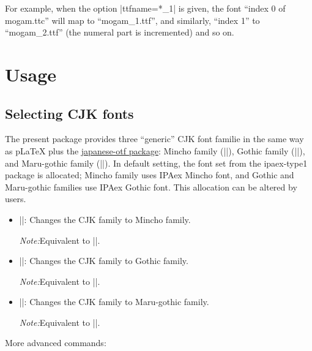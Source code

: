 \documentclass[a4paper]{article}
\newcommand{\Pkg}[1]{\textsf{#1}}
\newcommand{\Meta}[1]{$\langle$\textit{#1}$\rangle$}
\newcommand{\Note}{\par\noindent \emph{Note:}\quad}
\newcommand{\Means}{:\hspace{1em plus 1em}}
\newcommand{\wbr}{\linebreak[0]}
\providecommand{\pLaTeX}{p\LaTeX}
\begin{document}
For example, when the option |ttfname=*_1| is given, the font
``index 0 of mogam.ttc'' will map to ``mogam\_1.ttf'', and similarly,
``index 1'' to ``mogam\_2.ttf''
(the numeral part is incremented) and so on.


\section{Usage}
\label{sec:usage}

\subsection{Selecting CJK fonts}

The present package provides three ``generic'' CJK font familie 
in the same way as {\pLaTeX} plus the
\href{http://www.ctan.org/pkg/japanese-otf}{\Pkg{japanese-otf} package}:
Mincho family (|\mcfamily|), Gothic family (|\gtfamily|), and
Maru-gothic family (|\mgfamily|).
In default setting, the font set from the \Pkg{ipaex-type1} package
is allocated;
Mincho family uses IPAex Mincho font, and Gothic and Maru-gothic
families use IPAex Gothic font.
This allocation can be altered by users.

\begin{itemize}
\item |\mcfamily|\Means
  Changes the CJK family to Mincho family.
  \Note Equivalent to |\CJKfamily{\mcdefault}|.
\item |\gtfamily|\Means
  Changes the CJK family to Gothic family.
  \Note Equivalent to |\CJKfamily{\gtdefault}|.
\item |\mgfamily|\Means
  Changes the CJK family to Maru-gothic family.
  \Note Equivalent to |\CJKfamily{\mgdefault}|.
\end{itemize}

More advanced commands:

\end{document}
